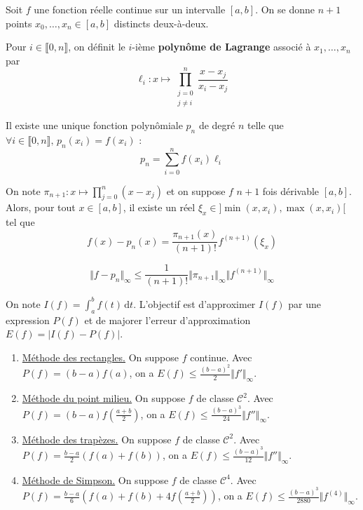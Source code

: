 
	Soit $f$ une fonction réelle continue sur un intervalle $[a,b]$. On se donne $n+1$ points $x_0, \dots, x_n \in [a,b]$ distincts deux-à-deux.

	\begin{definition}
		Pour $i \in \llbracket 0, n \rrbracket$, on définit le $i$-ième \textbf{polynôme de Lagrange} associé à $x_1, \dots, x_n$ par
		\[ \ell_i : x \mapsto \prod_{\substack{j=0\\j \neq i}}^n \frac{x-x_j}{x_i-x_j} \]
	\end{definition}

	\begin{theorem}
		Il existe une unique fonction polynômiale $p_n$ de degré $n$ telle que $\forall i \in \llbracket 0, n \rrbracket, \, p_n(x_i) = f(x_i)$ :
		\[ p_n = \sum_{i=0}^n f(x_i) \ell_i \]
	\end{theorem}

	\begin{theorem}
		On note $\pi_{n+1} : x \mapsto \prod_{j=0}^{n} (x-x_j)$ et on suppose $f$ $n+1$ fois dérivable $[a,b]$. Alors, pour tout $x \in [a,b]$, il existe un réel $\xi_x \in ]\min(x,x_i),\max(x,x_i)[$ tel que
		\[ f(x)-p_n(x) = \frac{\pi_{n+1}(x)}{(n+1)!} f^{(n+1)}(\xi_x) \]
	\end{theorem}

	\begin{corollary}
		\[ \Vert f - p_n \Vert_\infty \leq \frac{1}{(n+1)!} \Vert \pi_{n+1} \Vert_\infty \Vert f^{(n+1)} \Vert_\infty \]
	\end{corollary}


	\begin{application}
		On note $I(f) = \int_a^b f(t) \, \mathrm{d}t$. L'objectif est d'approximer $I(f)$ par une expression $P(f)$ et de majorer l'erreur d'approximation $E(f) = \vert I(f) - P(f) \vert$.
		\begin{enumerate}[label=(\roman*)]
			\item \underline{Méthode des rectangles.} On suppose $f$ continue. Avec $P(f) = (b-a)f(a)$, on a $E(f) \leq \frac{(b-a)^2}{2} \Vert f' \Vert_\infty$.
			\item \underline{Méthode du point milieu.} On suppose $f$ de classe $\mathcal{C}^2$. Avec $P(f) = (b-a)f \left( \frac{a+b}{2} \right)$, on a $E(f) \leq \frac{(b-a)^3}{24} \Vert f'' \Vert_\infty$.
			\item \underline{Méthode des trapèzes.} On suppose $f$ de classe $\mathcal{C}^2$. Avec $P(f) = \frac{b-a}{2} (f(a) + f(b))$, on a $E(f) \leq \frac{(b-a)^3}{12} \Vert f'' \Vert_\infty$.
			\item \underline{Méthode de Simpson.} On suppose $f$ de classe $\mathcal{C}^4$. Avec $P(f) = \frac{b-a}{6} \left(f(a) + f(b) + 4f \left( \frac{a+b}{2} \right)\right)$, on a $E(f) \leq \frac{(b-a)^3}{2880} \Vert f^{(4)} \Vert_\infty$.
		\end{enumerate}
	\end{application}

